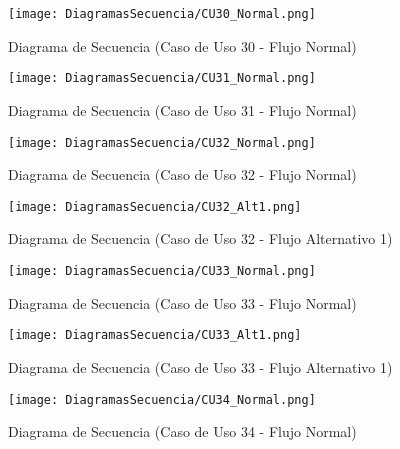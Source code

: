 \begin{landscape}
  \begin{figure}[!htbp]
    \centering
    \texttt{[image: DiagramasSecuencia/CU30\_Normal.png]}
    \caption{Diagrama de Secuencia (Caso de Uso 30 - Flujo Normal)}
    \label{fig:Secuencia_CU30_Normal}
  \end{figure}
\end{landscape}
\FloatBarrier

\begin{landscape}
  \begin{figure}[!htbp]
    \centering
    \texttt{[image: DiagramasSecuencia/CU31\_Normal.png]}
    \caption{Diagrama de Secuencia (Caso de Uso 31 - Flujo Normal)}
    \label{fig:Secuencia_CU31_Normal}
  \end{figure}
\end{landscape}
\FloatBarrier

\begin{landscape}
  \begin{figure}[!htbp]
    \centering
    \texttt{[image: DiagramasSecuencia/CU32\_Normal.png]}
    \caption{Diagrama de Secuencia (Caso de Uso 32 - Flujo Normal)}
    \label{fig:Secuencia_CU32_Normal}
  \end{figure}
\end{landscape}
\FloatBarrier

\begin{landscape}
  \begin{figure}[!htbp]
    \centering
    \texttt{[image: DiagramasSecuencia/CU32\_Alt1.png]}
    \caption{Diagrama de Secuencia (Caso de Uso 32 - Flujo Alternativo 1)}
    \label{fig:Secuencia_CU32_Alt1}
  \end{figure}
\end{landscape}
\FloatBarrier

\begin{landscape}
  \begin{figure}[!htbp]
    \centering
    \texttt{[image: DiagramasSecuencia/CU33\_Normal.png]}
    \caption{Diagrama de Secuencia (Caso de Uso 33 - Flujo Normal)}
    \label{fig:Secuencia_CU33_Normal}
  \end{figure}
\end{landscape}
\FloatBarrier

\begin{landscape}
  \begin{figure}[!htbp]
    \centering
    \texttt{[image: DiagramasSecuencia/CU33\_Alt1.png]}
    \caption{Diagrama de Secuencia (Caso de Uso 33 - Flujo Alternativo 1)}
    \label{fig:Secuencia_CU33_Alt1}
  \end{figure}
\end{landscape}
\FloatBarrier

\begin{landscape}
  \begin{figure}[!htbp]
    \centering
    \texttt{[image: DiagramasSecuencia/CU34\_Normal.png]}
    \caption{Diagrama de Secuencia (Caso de Uso 34 - Flujo Normal)}
    \label{fig:Secuencia_CU34_Normal}
  \end{figure}
\end{landscape}
\FloatBarrier
